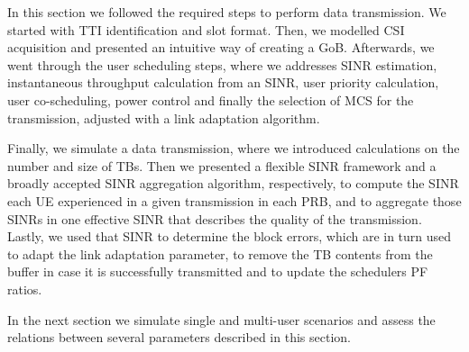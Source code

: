 In this section we followed the required steps to perform data transmission. We started with TTI identification and slot format. Then, we modelled CSI acquisition and presented an intuitive way of creating a \ac{GoB}. Afterwards, we went through the user scheduling steps, where we addresses SINR estimation, instantaneous throughput calculation from an SINR, user priority calculation, user co-scheduling, power control and finally the selection of MCS for the transmission, adjusted with a link adaptation algorithm.

Finally, we simulate a data transmission, where we introduced calculations on the number and size of TBs. Then we presented a flexible SINR framework and a broadly accepted SINR aggregation algorithm, respectively, to compute the SINR each UE experienced in a given transmission in each PRB, and to aggregate those SINRs in one effective SINR that describes the quality of the transmission. Lastly, we used that SINR to determine the block errors, which are in turn used to adapt the link adaptation parameter, to remove the TB contents from the buffer in case it is successfully transmitted and to update the schedulers PF ratios.

In the next section we simulate single and multi-user scenarios and assess the relations between several parameters described in this section. 

